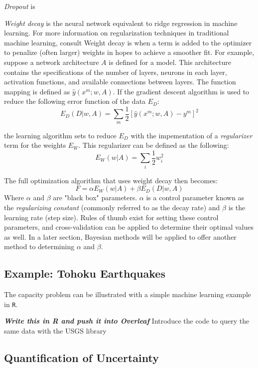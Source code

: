 \textit{Dropout} is \cite{srivastava2014dropout}

\textit{Weight decay} is the neural network equivalent to ridge regression in machine learning.  For more information on regularization techniques in traditional machine learning, consult \cite{Goodfellow-et-al-2016}  Weight decay is when a  term is added to the optimizer to penalize (often larger) weights in hopes to achieve a smoother fit. \cite{mackay1992practical}  For example, suppose a network architecture $A$ is defined for a model.  This architecture contains the specifications of the number of layers, neurons in each layer, activation functions, and available connections between layers.  The function mapping is defined as $\hat{y}(x^m;w,A)$.  If the gradient descent algorithm is used to reduce the following error function of the data $E_D$:
$$
E_D(D|w,A) = \sum_m \frac{1}{2} [\hat{y}(x^m;w,A) - y^m]^2
$$

the learning algorithm sets to reduce $E_D$ with the impementation of a \textit{regularizer} term for the weights $E_W$.  This regularizer can be defined as the following:
$$
E_W(w|A) = \sum_i \frac{1}{2} w_i^2
$$

The full optimization algorithm that uses weight decay then becomes:
$$
F = \alpha E_W(w|A) + \beta E_D(D|w,A)
$$
Where $\alpha$ and $\beta$ are "black box" parameters. \cite{mackay1992practical}  $\alpha$ is a control parameter known as the \textit{regularizing constant} (commonly referred to as the decay rate) and $\beta$ is the learning rate (step size).  Rules of thumb exist for setting these control parameters, and cross-validation can be applied to determine their optimal values as well.  In a later section, Bayesian methods will be applied to offer another method to determining $\alpha$ and $\beta$.


\subsection{Example: Tohoku Earthquakes}

The capacity problem can be illustrated with a simple machine learning example in \texttt{R}.

\textbf{\textit{Write this in R and push it into Overleaf}}
Introduce the code to query the same data with the USGS library





\subsection{Quantification of Uncertainty}

